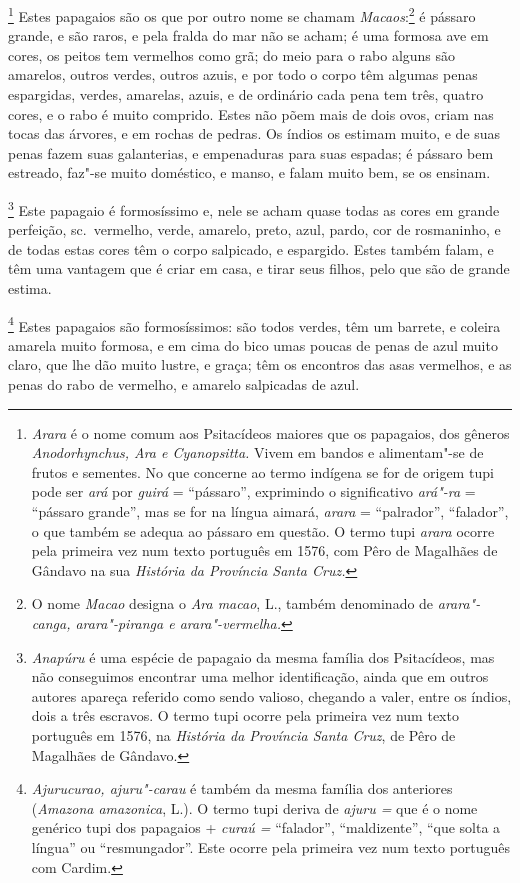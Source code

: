 \footnote{ \textit{Arara} é o nome comum aos
Psitacídeos maiores que os papagaios, dos gêneros
\textit{Anodorhynchus, Ara e Cyanopsitta.} Vivem em bandos e
alimentam"-se de frutos e sementes. No que concerne ao termo indígena se
for de origem tupi pode ser \textit{ará} por \textit{guirá} = ``pássaro'', 
exprimindo o significativo \textit{ará"-ra} = ``pássaro
grande'', mas se for na língua aimará, \textit{arara} = ``palrador'',
``falador'', o que também se adequa ao pássaro em questão. O termo tupi
\textit{arara} ocorre pela primeira vez num texto português em 1576,
com Pêro de Magalhães de Gândavo na sua \textit{História da Província 
Santa Cruz.} } Estes papagaios são os que por outro nome se
chamam \textit{Macaos}:\footnote{ O nome \textit{Macao} designa o
\textit{Ara macao}, L., também denominado de \textit{arara"-canga,
arara"-piranga e arara"-vermelha.}} é pássaro grande, e são raros, e pela
fralda do mar não se acham; é uma formosa ave em cores, os peitos tem
vermelhos como grã; do meio para o rabo alguns são amarelos, outros
verdes, outros azuis, e por todo o corpo têm algumas penas espargidas,
verdes, amarelas, azuis, e de ordinário cada pena tem três, quatro
cores, e o rabo é muito comprido. Estes não põem mais de dois ovos,
criam nas tocas das árvores, e em rochas de pedras. Os índios os
estimam muito, e de suas penas fazem suas galanterias, e empenaduras
para suas espadas; é pássaro bem estreado, faz"-se muito doméstico, e
manso, e falam muito bem, se os ensinam.

\footnote{ \textit{Anapúru} é uma espécie de
papagaio da mesma família dos Psitacídeos, mas não conseguimos
encontrar uma melhor identificação, ainda que em outros autores apareça
referido como sendo valioso, chegando a valer, entre os índios, dois a
três escravos. O termo tupi ocorre pela primeira vez num texto
português em 1576, na \textit{História da Província Santa Cruz}, de
Pêro de Magalhães de Gândavo.} Este papagaio é formosíssimo e, nele
se acham quase todas as cores em grande perfeição, sc.~vermelho,
verde, amarelo, preto, azul, pardo, cor de rosmaninho, e de todas estas
cores têm o corpo salpicado, e espargido. Estes também falam, e têm uma
vantagem que é criar em casa, e tirar seus filhos, pelo que são de grande estima. 

\footnote{ \textit{Ajurucurao, ajuru"-carau} é
também da mesma família dos anteriores (\textit{Amazona amazonica}, L.). 
O termo tupi deriva de \textit{ajuru =} que é o nome genérico
tupi dos papagaios + \textit{curaú =} ``falador'', ``maldizente'', ``que
solta a língua'' ou ``resmungador''. Este ocorre pela primeira vez num
texto português com Cardim.} Estes papagaios são formosíssimos: 
são todos verdes, têm um barrete, e coleira amarela
muito formosa, e em cima do bico umas poucas de penas de azul muito
claro, que lhe dão muito lustre, e graça; têm os encontros das asas
vermelhos, e as penas do rabo de vermelho, e amarelo salpicadas de azul.

